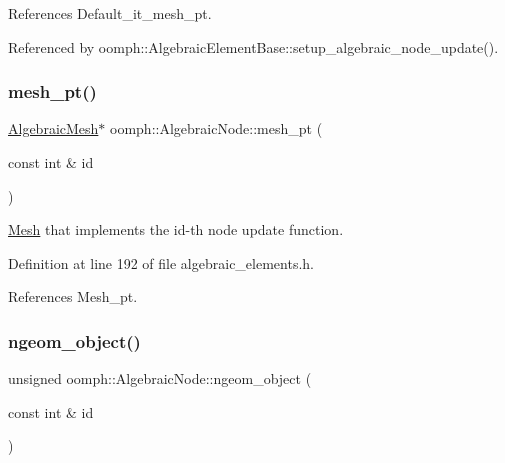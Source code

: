 References Default\+\_\+it\+\_\+mesh\+\_\+pt.



Referenced by oomph\+::\+Algebraic\+Element\+Base\+::setup\+\_\+algebraic\+\_\+node\+\_\+update().

\mbox{\label{classoomph_1_1AlgebraicNode_ae07189bb28dcba7d31e736de391fe54f}} 
\subsubsection{\texorpdfstring{mesh\+\_\+pt()}{mesh\_pt()}\hspace{0.1cm}{\footnotesize\ttfamily [2/2]}}
{\footnotesize\ttfamily \hyperlink{classoomph_1_1AlgebraicMesh}{Algebraic\+Mesh}$\ast$ oomph\+::\+Algebraic\+Node\+::mesh\+\_\+pt (\begin{DoxyParamCaption}\item[{const int \&}]{id }\end{DoxyParamCaption})\hspace{0.3cm}{\ttfamily [inline]}}



\hyperlink{classoomph_1_1Mesh}{Mesh} that implements the id-\/th node update function. 



Definition at line 192 of file algebraic\+\_\+elements.\+h.



References Mesh\+\_\+pt.

\mbox{\label{classoomph_1_1AlgebraicNode_a0e1fa66d3543da39a5e728d8af5c1734}} 
\subsubsection{\texorpdfstring{ngeom\+\_\+object()}{ngeom\_object()}\hspace{0.1cm}{\footnotesize\ttfamily [1/2]}}
{\footnotesize\ttfamily unsigned oomph\+::\+Algebraic\+Node\+::ngeom\+\_\+object (\begin{DoxyParamCaption}\item[{const int \&}]{id }\end{DoxyParamCaption})\hspace{0.3cm}{\ttfamily [inline]}}



